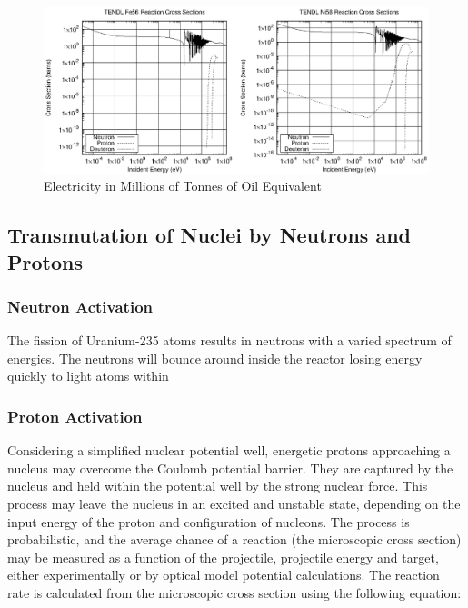 \begin{figure}[tbp]
  \begin{center}
    \includegraphics[width=15.0cm]{chapters/background_activity/plots/npd_xs/fe56_ni58_xs.eps}
    \caption{Electricity in Millions of Tonnes of Oil Equivalent}
    \label{fig:electricityusagesuk}
  \end{center}
\end{figure}







\subsection{Transmutation of Nuclei by Neutrons and Protons}

\subsubsection{Neutron Activation}

The fission of Uranium-235 atoms results in neutrons with a varied spectrum of energies.  The neutrons will bounce around inside the reactor losing energy quickly to light atoms within 



\subsubsection{Proton Activation}

Considering a simplified nuclear potential well, energetic protons approaching a nucleus may overcome the Coulomb potential barrier.  They are captured by the nucleus and held within the potential well by the strong nuclear force.  This process may leave the nucleus in an excited and unstable state, depending on the input energy of the proton and configuration of nucleons.  The process is probabilistic, and the average chance of a reaction (the microscopic cross section) may be measured as a function of the projectile, projectile energy and target, either experimentally or by optical model potential calculations.  The reaction rate is calculated from the microscopic cross section using the following equation:

